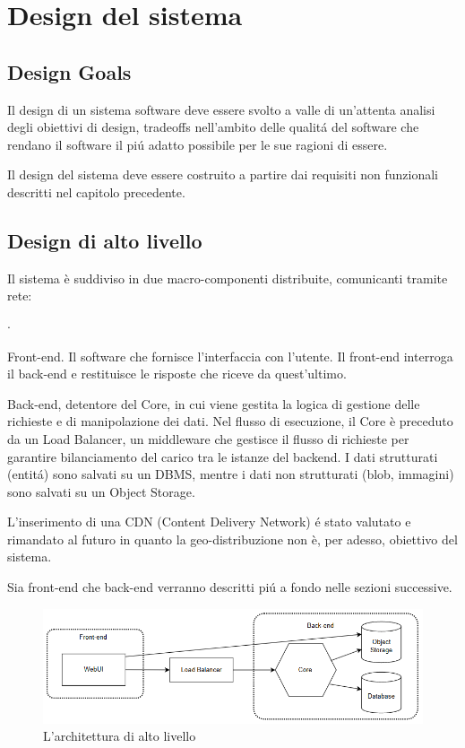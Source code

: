 \chapter{Design del sistema}

\section{Design Goals}
Il design di un sistema software deve essere svolto a valle di un'attenta 
analisi degli obiettivi di design, tradeoffs nell'ambito delle qualitá del 
software che rendano il software il piú adatto possibile per le sue ragioni 
di essere.

Il design del sistema deve essere costruito a partire dai requisiti non funzionali
descritti nel capitolo precedente.

\section{Design di alto livello}
Il sistema è suddiviso in due macro-componenti distribuite, comunicanti tramite 
rete:
\begin{list}{$\cdot$}{}
    \item Front-end. Il software che fornisce l'interfaccia con l'utente. Il front-end 
    interroga il back-end e restituisce le risposte che riceve da quest'ultimo.
    \item Back-end, detentore del Core, in cui viene gestita la logica di gestione delle 
    richieste e di manipolazione dei dati. Nel flusso di esecuzione, il Core è preceduto 
    da un Load Balancer, un middleware che gestisce il flusso di richieste per garantire 
    bilanciamento del carico tra le istanze del backend. I dati strutturati (entitá) sono 
    salvati su un DBMS, mentre i dati non strutturati (blob, immagini) sono salvati su un 
    Object Storage.
\end{list}

L'inserimento di una CDN (Content Delivery Network) é stato valutato e rimandato al 
futuro in quanto la geo-distribuzione non è, per adesso, obiettivo del sistema.

Sia front-end che back-end verranno descritti piú a fondo nelle sezioni successive.

\begin{figure}[h]
    \centering
    \includegraphics[width=\textwidth]{assets/diagrams/high-level-arch.png}
    \caption{L'architettura di alto livello}
    \label{fig:Architettura di alto livello}
\end{figure}

